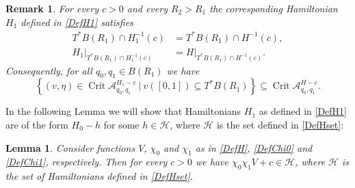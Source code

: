 \documentclass[a4paper]{amsart}
\newtheorem{lem}[thm]{Lemma}%
\newtheorem{rem}[thm]{Remark}%
\numberwithin{equation}{section}
\newcommand{\A}{\mathcal{A}}
\newcommand{\Crit}{\operatorname{Crit}}
\begin{document}
\begin{rem}\label{rem:equality}
For every $c>0$ and every $R_2>R_1$ the corresponding Hamiltonian $H_1$ defined in \eqref{DefH1} satisfies
\begin{align*}
T^*B(R_1)\cap H_1^{-1}(c)& =T^*B(R_1)\cap H^{-1}(c),\\
 H_1\big|_{T^*B(R_1)\cap H_1^{-1}(c)}& =H\big|_{T^*B(R_1)\cap H^{-1}(c)}.
\end{align*}
Consequently, for all $q_0,q_1\in B(R_1)$ we have
$$
\left\lbrace (v,\eta) \in \Crit \A_{q_0,q_1}^{H_1-c} \ \big|\ v([0,1])\subseteq T^*B(R_1) \right\rbrace \subseteq \Crit \A_{q_0,q_1}^{H-c}.
$$
\end{rem}
In the following Lemma we will show that Hamiltonians $H_1$ as defined in \eqref{DefH1} are of the form $H_0-h$ for some $h \in \mathcal{H}$, where $\mathcal{H}$ is the set defined in \eqref{DefHset}:
\begin{lem}
Consider functions $V$, $\chi_0$ and $\chi_1$ as in \eqref{DefH}, \eqref{DefChi0} and \eqref{DefChi1}, respectively. Then for every $c>0$ we have $\chi_0\chi_1 V+c
\in \mathcal{H}$, where $\mathcal{H}$ is the set of Hamiltonians defined in \eqref{DefHset}.
\end{lem}
\end{document}
